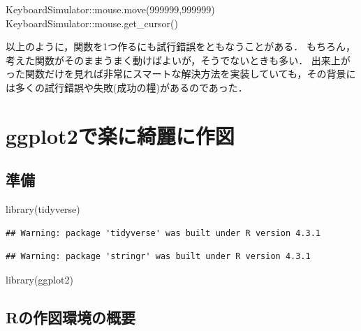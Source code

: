 \documentclass[
]{article}
\newenvironment{Shaded}{\begin{snugshade}}{\end{snugshade}}
\newcommand{\DecValTok}[1]{\textcolor[rgb]{0.00,0.00,0.81}{#1}}
\newcommand{\FunctionTok}[1]{\textcolor[rgb]{0.00,0.00,0.00}{#1}}
\newcommand{\NormalTok}[1]{#1}
\newcommand{\SpecialCharTok}[1]{\textcolor[rgb]{0.00,0.00,0.00}{#1}}
\begin{document}
\begin{Shaded}
\begin{Highlighting}[]
\NormalTok{KeyboardSimulator}\SpecialCharTok{::}\FunctionTok{mouse.move}\NormalTok{(}\DecValTok{999999}\NormalTok{,}\DecValTok{999999}\NormalTok{)}
\NormalTok{KeyboardSimulator}\SpecialCharTok{::}\FunctionTok{mouse.get\_cursor}\NormalTok{()}
\end{Highlighting}
\end{Shaded}

以上のように，関数を1つ作るにも試行錯誤をともなうことがある．
もちろん，考えた関数がそのままうまく動けばよいが，そうでないときも多い．
出来上がった関数だけを見れば非常にスマートな解決方法を実装していても，その背景には多くの試行錯誤や失敗(成功の糧)があるのであった．

\hypertarget{ggplot2}{%
\section{ggplot2で楽に綺麗に作図}\label{ggplot2}}

\hypertarget{ux6e96ux5099-9}{%
\subsection{準備}\label{ux6e96ux5099-9}}

\begin{Shaded}
\begin{Highlighting}[]
\FunctionTok{library}\NormalTok{(tidyverse)}
\end{Highlighting}
\end{Shaded}

\begin{verbatim}
## Warning: package 'tidyverse' was built under R version 4.3.1
\end{verbatim}

\begin{verbatim}
## Warning: package 'stringr' was built under R version 4.3.1
\end{verbatim}

\begin{Shaded}
\begin{Highlighting}[]
\FunctionTok{library}\NormalTok{(ggplot2)}
\end{Highlighting}
\end{Shaded}

\hypertarget{rux306eux4f5cux56f3ux74b0ux5883ux306eux6982ux8981}{%
\subsection{Rの作図環境の概要}\label{rux306eux4f5cux56f3ux74b0ux5883ux306eux6982ux8981}}
\end{document}
